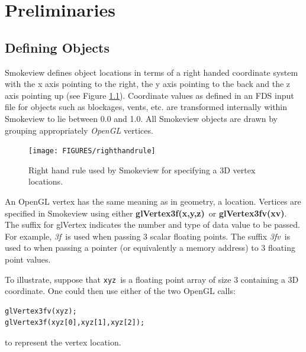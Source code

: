 \documentclass[11pt,twoside]{book}
\newcommand{\figoptions}{htp}
\begin{document}
%
%

\chapter{Preliminaries}
\label{visoverview}
\section{Defining Objects} Smokeview defines object locations in terms of a right handed coordinate system with the x axis pointing to the right, the y axis pointing to the back and the z axis pointing up (see Figure \ref{figrighthand}).  Coordinate values as defined in an FDS input file for objects such as blockages, vents, etc. are transformed internally within Smokeview to lie between 0.0 and 1.0.
All Smokeview objects are drawn by grouping appropriately {\em OpenGL} vertices.
\begin{figure}[\figoptions]
\begin{center}
\texttt{[image: FIGURES/righthandrule]}
\end{center}
\caption{Right hand rule used by Smokeview for specifying a 3D vertex locations.}
\label{figrighthand}
\end{figure}

An OpenGL vertex has the same meaning as in geometry, a location.
Vertices are specified in Smokeview using either {\bf glVertex3f(x,y,z)}\ or {\bf glVertex3fv(xv)}.  The suffix for glVertex indicates the number and type of data value to be passed.  For example, {\em 3f}\ is used when passing 3 scalar floating points.  The suffix {\em 3fv}\ is used to when passing a pointer (or equivalently a memory address) to 3 floating point  values.

To illustrate, suppose that {\tt xyz}\ is a floating point array of size 3 containing a 3D coordinate.  One could then use either of the two OpenGL calls:
\begin{verbatim}
glVertex3fv(xyz);
glVertex3f(xyz[0],xyz[1],xyz[2]);
\end{verbatim}
to represent the vertex location.
\end{document}
